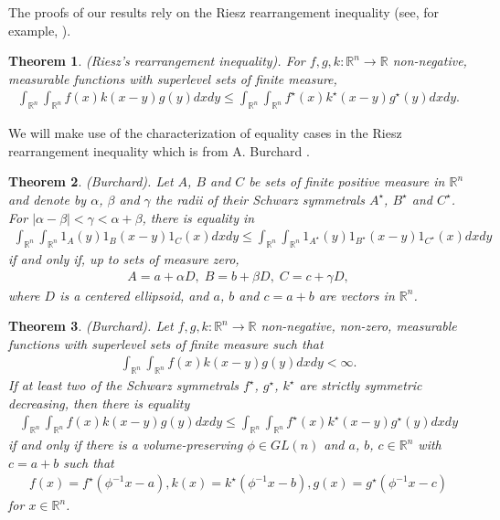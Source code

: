 \documentclass[preprint,12pt]{elsarticle}
\newtheorem{thm}{Theorem}
\begin{document}
The proofs of our results rely on the Riesz rearrangement inequality (see, for example, \cite[Theorem 3.7]{ELL01}).
\begin{thm} \label{Rri} (Riesz’s rearrangement inequality). For $f,g,k:\mathbb{R}^n\to \mathbb{R}$ non-negative, measurable functions with superlevel sets of finite measure,
\begin{eqnarray*}
\int_{\mathbb{R}^n}\int_{\mathbb{R}^n}f(x)k(x-y)g(y)dxdy\leq \int_{\mathbb{R}^n}\int_{\mathbb{R}^n}f^{\star }(x)k^{\star}(x-y)g^{\star}(y)dxdy.
\end{eqnarray*}
\end{thm}
We will make use of the characterization of equality cases in the Riesz rearrangement inequality which is from A. Burchard \cite{Burchard96}.
\begin{thm} \label{2.1Burchard}(Burchard). Let $A$, $B$ and $C$ be sets of finite positive measure in $\mathbb{R}^n$ and denote by $\alpha$, $\beta$ and $\gamma$ the radii of their Schwarz symmetrals $A^{\star}$, $B^{\star}$ and $C^{\star}$. For $|\alpha -\beta |<\gamma <\alpha +\beta$, there is equality in
\begin{eqnarray*}
\int_{\mathbb{R}^n}\int_{\mathbb{R}^n}1_{A}(y)1_{B}(x-y)1_{C}(x)dxdy\leq \int_{\mathbb{R}^n}\int_{\mathbb{R}^n}1_{A^{\star}}(y)1_{B^{\star}}(x-y)1_{C^{\star}}(x)dxdy
\end{eqnarray*}
if and only if, up to sets of measure zero,
\begin{eqnarray*}
A=a+\alpha D,\; B=b+\beta D,\; C=c+\gamma D,
\end{eqnarray*}
where $D$ is a centered ellipsoid, and $a$, $b$ and $c = a + b$ are vectors in $\mathbb{R}^n$.
\end{thm}
\begin{thm} \label{2.1} 
(Burchard). Let $f,g,k:\mathbb{R}^n\to \mathbb{R}$ non-negative, non-zero, measurable functions with superlevel sets of finite measure such that
\begin{eqnarray*}
\int_{\mathbb{R}^n}\int_{\mathbb{R}^n}f(x)k(x-y)g(y)dxdy<\infty. 
\end{eqnarray*}
If at least two of the Schwarz symmetrals $f^{\star }$, $g^{\star}$, $k^{\star}$ are strictly symmetric decreasing, then there is equality
\begin{eqnarray*}
\int_{\mathbb{R}^n}\int_{\mathbb{R}^n}f(x)k(x-y)g(y)dxdy\leq \int_{\mathbb{R}^n}\int_{\mathbb{R}^n}f^{\star }(x)k^{\star}(x-y)g^{\star}(y)dxdy
\end{eqnarray*}
if and only if there is a volume-preserving $\phi\in GL(n)$ and $a$, $b$, $c \in \mathbb{R}^n$ with $c = a+b$ such that
\begin{eqnarray*}
f(x)=f^{\star }(\phi^{-1}x-a), k(x)=k^{\star}(\phi^{-1}x-b), g(x)=g^{\star}(\phi^{-1}x-c) 
\end{eqnarray*}
for $x \in \mathbb{R}^n$.
\end{thm}
\end{document}
